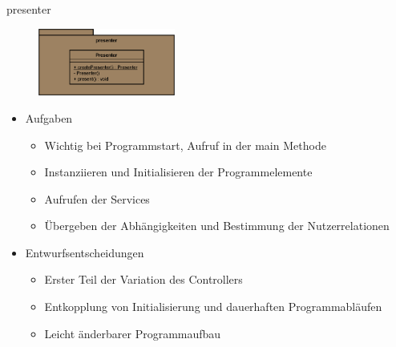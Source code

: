 \begin{frame}{presenter}
  \begin{figure}
    \centering
    \includegraphics[width=0.4\textwidth]{./images/presenter.png}
  \end{figure}
  \begin{itemize}[<+->]
    \item Aufgaben
      \begin{itemize}
        \item Wichtig bei Programmstart, Aufruf in der main Methode
        \item Instanziieren und Initialisieren der Programmelemente
        \item Aufrufen der Services
        \item Übergeben der Abhängigkeiten und Bestimmung der Nutzerrelationen
      \end{itemize}
      \item Entwurfsentscheidungen
        \begin{itemize}
          \item Erster Teil der Variation des Controllers
          \item Entkopplung von Initialisierung und dauerhaften Programmabläufen
          \item Leicht änderbarer Programmaufbau
        \end{itemize}
  \end{itemize}
\end{frame}
